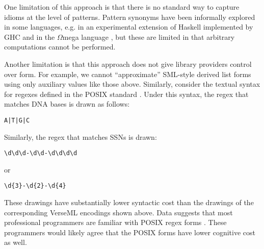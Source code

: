 One limitation of this approach is that there is no standard way to capture idioms at the level of patterns. Pattern synonyms have been informally explored in some languages, e.g. in an experimental extension of Haskell implemented by GHC \cite{GHC-extensions} and in the $\Omega$mega language \cite{DBLP:conf/cefp/SheardL07}, but these are limited in that arbitrary computations cannot be performed.

Another limitation is that this approach does not give library providers control over form. For example, we cannot ``approximate'' SML-style derived list forms using only auxiliary values like those above. 
Similarly, consider the textual syntax for regexes defined in the POSIX standard \cite{STD95954}. Under this syntax, the regex that matches DNA bases is drawn as follows:
\begin{lstlisting}[numbers=none]
A|T|G|C
\end{lstlisting}
Similarly, the regex that matches SSNs is drawn:
\begin{lstlisting}[numbers=none]
\d\d\d-\d\d-\d\d\d\d
\end{lstlisting}
or
\begin{lstlisting}[numbers=none]
\d{3}-\d{2}-\d{4}
\end{lstlisting}
These drawings have substantially lower syntactic cost than the drawings of the corresponding VerseML encodings shown above. Data suggests that most professional programmers are familiar with POSIX regex forms \cite{Omar:2012:ACC:2337223.2337324}. These programmers would likely agree that the POSIX forms have lower cognitive cost as well. 

\vspace{-6px}
